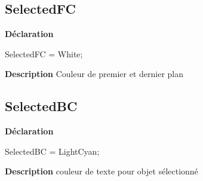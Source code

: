 \documentclass{report}
\newif\ifpdf
\begin{document}
\subsection*{SelectedFC}
\fi
\label{LesMenus-SelectedFC}
\begin{list}{}{
\setlength{\itemindent}{0cm}
\setlength{\listparindent}{0cm}
\setlength{\leftmargin}{\evensidemargin}
\addtolength{\leftmargin}{\tmplength}
\settowidth{\labelsep}{X}
\addtolength{\leftmargin}{\labelsep}
\setlength{\labelwidth}{\tmplength}
}
\item[\textbf{Déclaration}\hfill]
\ifpdf
\begin{flushleft}
\fi
\begin{ttfamily}
SelectedFC = White;\end{ttfamily}

\ifpdf
\end{flushleft}
\fi

\par
\item[\textbf{Description}]
Couleur de premier et dernier plan

\end{list}
\ifpdf
\subsection*{\large{\textbf{SelectedBC}}\normalsize\hspace{1ex}\hrulefill}
\else
\subsection*{SelectedBC}
\fi
\label{LesMenus-SelectedBC}
\begin{list}{}{
\setlength{\itemindent}{0cm}
\setlength{\listparindent}{0cm}
\setlength{\leftmargin}{\evensidemargin}
\addtolength{\leftmargin}{\tmplength}
\settowidth{\labelsep}{X}
\addtolength{\leftmargin}{\labelsep}
\setlength{\labelwidth}{\tmplength}
}
\item[\textbf{Déclaration}\hfill]
\ifpdf
\begin{flushleft}
\fi
\begin{ttfamily}
SelectedBC = LightCyan;\end{ttfamily}

\ifpdf
\end{flushleft}
\fi

\par
\item[\textbf{Description}]
couleur de texte pour objet sélectionné

\end{list}
\ifpdf
\end{document}
